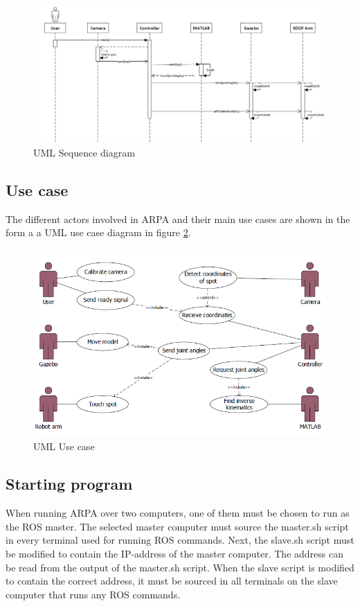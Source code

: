 \documentclass[11pt,a4paper, titlepage]{article}
\begin{document}
	
	\begin{figure}[H]
		\includegraphics[width=\linewidth]{../Diagrams/SequenceDiagram-v1.png}
		\caption{UML Sequence diagram}
		\label{fig:seq-diagram}
	\end{figure}
	
	\subsection{Use case}
	The different actors involved in ARPA and their main use cases are shown in the form a a UML use case diagram in figure \ref{fig:use-case}.
	
	\begin{figure}[H]
		\includegraphics[width=\linewidth]{../Diagrams/UseCase.png}
		\caption{UML Use case}
		\label{fig:use-case}
	\end{figure}
		
	
	\subsection{Starting program}
	\label{startup}
	
	When running ARPA over two computers, one of them must be chosen to run as the ROS master. The selected master computer must source the master.sh script in every terminal used for running ROS commands. Next, the slave.sh script must be modified to contain the IP-address of the master computer. The address can be read from the output of the master.sh script. When the slave script is modified to contain the correct address, it must be sourced in all terminals on the slave computer that runs any ROS commands.
	
\end{document}
